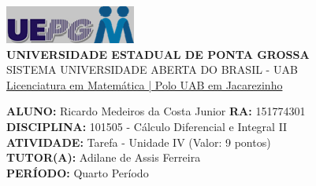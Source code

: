 \documentclass[a4paper, 12pt]{article}
\begin{document}
\begin{flushleft}\includegraphics{logo}\\
\textbf{UNIVERSIDADE ESTADUAL DE PONTA GROSSA} \\
SISTEMA UNIVERSIDADE ABERTA DO BRASIL - UAB \\
\underline{Licenciatura em Matemática | Polo UAB em Jacarezinho}\end{flushleft} 
\textbf{ALUNO:} Ricardo Medeiros da Costa Junior   \textbf{RA:} 151774301 \\
\textbf{DISCIPLINA:} 101505 - Cálculo Diferencial e Integral II \\
\textbf{ATIVIDADE:} Tarefa - Unidade IV (Valor: 9 pontos) \\
\textbf{TUTOR(A):} Adilane de Assis Ferreira \\
\textbf{PERÍODO:} Quarto Período \\
\end{document}
